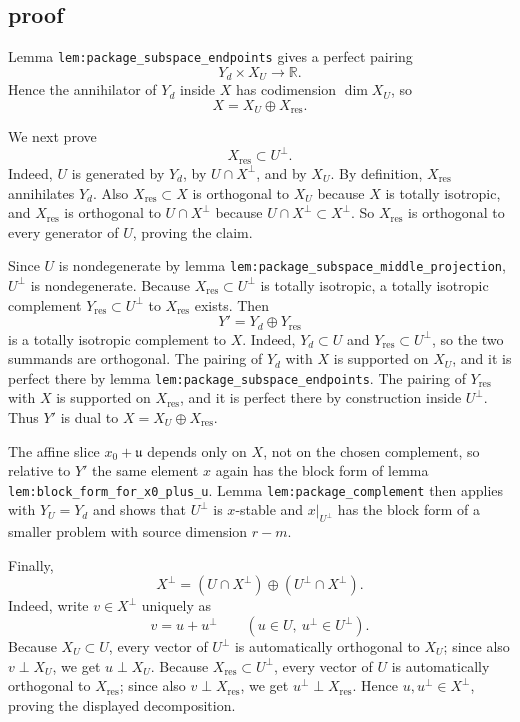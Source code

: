 \documentclass[
]{article}
\begin{document}
\subsection{proof}\label{proof-18}

Lemma \texttt{lem:package\_subspace\_endpoints} gives a perfect pairing
\[
Y_d\times X_U\longrightarrow \mathbb R.
\] Hence the annihilator of \(Y_d\) inside \(X\) has codimension
\(\dim X_U\), so \[
X=X_U\oplus X_{\mathrm{res}}.
\]

We next prove \[
X_{\mathrm{res}}\subset U^\perp.
\] Indeed, \(U\) is generated by \(Y_d\), by \(U\cap X^\perp\), and by
\(X_U\). By definition, \(X_{\mathrm{res}}\) annihilates \(Y_d\). Also
\(X_{\mathrm{res}}\subset X\) is orthogonal to \(X_U\) because \(X\) is
totally isotropic, and \(X_{\mathrm{res}}\) is orthogonal to
\(U\cap X^\perp\) because \(U\cap X^\perp\subset X^\perp\). So
\(X_{\mathrm{res}}\) is orthogonal to every generator of \(U\), proving
the claim.

Since \(U\) is nondegenerate by lemma
\texttt{lem:package\_subspace\_middle\_projection}, \(U^\perp\) is
nondegenerate. Because \(X_{\mathrm{res}}\subset U^\perp\) is totally
isotropic, a totally isotropic complement
\(Y_{\mathrm{res}}\subset U^\perp\) to \(X_{\mathrm{res}}\) exists. Then
\[
Y'=Y_d\oplus Y_{\mathrm{res}}
\] is a totally isotropic complement to \(X\). Indeed, \(Y_d\subset U\)
and \(Y_{\mathrm{res}}\subset U^\perp\), so the two summands are
orthogonal. The pairing of \(Y_d\) with \(X\) is supported on \(X_U\),
and it is perfect there by lemma
\texttt{lem:package\_subspace\_endpoints}. The pairing of
\(Y_{\mathrm{res}}\) with \(X\) is supported on \(X_{\mathrm{res}}\),
and it is perfect there by construction inside \(U^\perp\). Thus \(Y'\)
is dual to \(X=X_U\oplus X_{\mathrm{res}}\).

The affine slice \(x_0+\mathfrak u\) depends only on \(X\), not on the
chosen complement, so relative to \(Y'\) the same element \(x\) again
has the block form of lemma \texttt{lem:block\_form\_for\_x0\_plus\_u}.
Lemma \texttt{lem:package\_complement} then applies with \(Y_U=Y_d\) and
shows that \(U^\perp\) is \(x\)-stable and \(x|_{U^\perp}\) has the
block form of a smaller problem with source dimension \(r-m\).

Finally, \[
X^\perp=(U\cap X^\perp)\oplus (U^\perp\cap X^\perp).
\] Indeed, write \(v\in X^\perp\) uniquely as \[
v=u+u^\perp
\qquad(u\in U,\ u^\perp\in U^\perp).
\] Because \(X_U\subset U\), every vector of \(U^\perp\) is
automatically orthogonal to \(X_U\); since also \(v\perp X_U\), we get
\(u\perp X_U\). Because \(X_{\mathrm{res}}\subset U^\perp\), every
vector of \(U\) is automatically orthogonal to \(X_{\mathrm{res}}\);
since also \(v\perp X_{\mathrm{res}}\), we get
\(u^\perp\perp X_{\mathrm{res}}\). Hence \(u,u^\perp\in X^\perp\),
proving the displayed decomposition.
\end{document}
